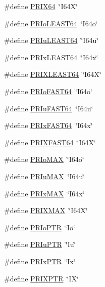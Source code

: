 \begin{DoxyCompactItemize}
\#define \hyperlink{a00113_af56fc48030ace2ec83125c0f5f42816c}{P\+R\+I\+X64}~\char`\"{}I64X\char`\"{}
\item 
\#define \hyperlink{a00113_a9540a0a3ff33b4f6a0feee15f3066984}{P\+R\+Io\+L\+E\+A\+S\+T64}~\char`\"{}I64o\char`\"{}
\item 
\#define \hyperlink{a00113_a20b768c89c8693bdc3df5f2e76fe018c}{P\+R\+Iu\+L\+E\+A\+S\+T64}~\char`\"{}I64u\char`\"{}
\item 
\#define \hyperlink{a00113_a4df46377b2a3292ce6c7fd6724a045ab}{P\+R\+Ix\+L\+E\+A\+S\+T64}~\char`\"{}I64x\char`\"{}
\item 
\#define \hyperlink{a00113_a4d1806a4ea59b88a7bd00d88b7e1747d}{P\+R\+I\+X\+L\+E\+A\+S\+T64}~\char`\"{}I64X\char`\"{}
\item 
\#define \hyperlink{a00113_aba7ffd10c01ee7e1264300568ade319e}{P\+R\+Io\+F\+A\+S\+T64}~\char`\"{}I64o\char`\"{}
\item 
\#define \hyperlink{a00113_ac1fdefbae4d6c8dcef5b91ef5b778a1c}{P\+R\+Iu\+F\+A\+S\+T64}~\char`\"{}I64u\char`\"{}
\item 
\#define \hyperlink{a00113_a73fe58317ae146f316ddb0736d9ed9a4}{P\+R\+Ix\+F\+A\+S\+T64}~\char`\"{}I64x\char`\"{}
\item 
\#define \hyperlink{a00113_ab94e8153da1da9e2762277c6b1cf21d7}{P\+R\+I\+X\+F\+A\+S\+T64}~\char`\"{}I64X\char`\"{}
\item 
\#define \hyperlink{a00113_a73ec9b744a867844fb1cbf5d600e15da}{P\+R\+Io\+M\+AX}~\char`\"{}I64o\char`\"{}
\item 
\#define \hyperlink{a00113_a5231235fbdc84d556db88609b469982b}{P\+R\+Iu\+M\+AX}~\char`\"{}I64u\char`\"{}
\item 
\#define \hyperlink{a00113_a1cb5f16ab28d09fa5fe07068bb8e2cea}{P\+R\+Ix\+M\+AX}~\char`\"{}I64x\char`\"{}
\item 
\#define \hyperlink{a00113_aa7e1f0c8df36d801c81f6db762ec67ec}{P\+R\+I\+X\+M\+AX}~\char`\"{}I64X\char`\"{}
\item 
\#define \hyperlink{a00113_a1468793ce960b477922ef92b36a6c802}{P\+R\+Io\+P\+TR}~\char`\"{}Io\char`\"{}
\item 
\#define \hyperlink{a00113_aa1ca3a85113e897b5cf7ed6b92d74de2}{P\+R\+Iu\+P\+TR}~\char`\"{}Iu\char`\"{}
\item 
\#define \hyperlink{a00113_a9c3c25e6145e629e4c9fabddc6061c30}{P\+R\+Ix\+P\+TR}~\char`\"{}Ix\char`\"{}
\item 
\#define \hyperlink{a00113_a65d9856517198cfc21558c0d6df64207}{P\+R\+I\+X\+P\+TR}~\char`\"{}IX\char`\"{}
\item 

\end{DoxyCompactItemize}
